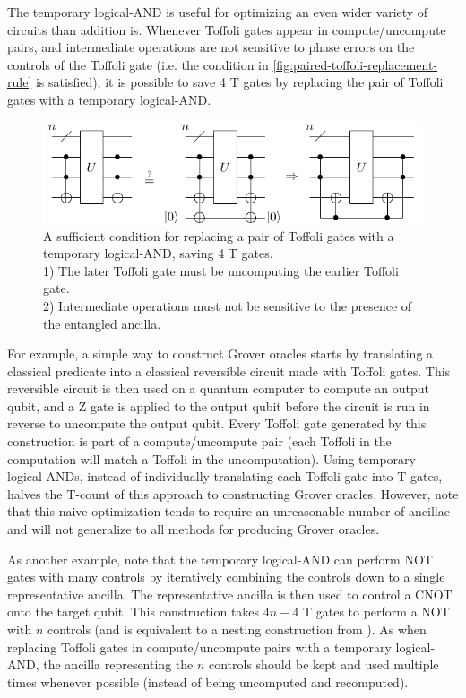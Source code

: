 \documentclass[twocolumn,accepted=2018-05-25]{quantumarticle}
\begin{document}
The temporary logical-AND is useful for optimizing an even wider variety of circuits than addition is.
Whenever Toffoli gates appear in compute/uncompute pairs, and intermediate operations are not sensitive to phase errors on the controls of the Toffoli gate (i.e. the condition in \autoref{fig:paired-toffoli-replacement-rule} is satisfied), it is possible to save 4 T gates by replacing the pair of Toffoli gates with a temporary logical-AND.

\begin{figure}
  \includegraphics[width=\linewidth]{paired-toffoli-replacement-rule.pdf}
  \caption{
	A sufficient condition for replacing a pair of Toffoli gates with a temporary logical-AND, saving 4 T gates.\\
	1) The later Toffoli gate must be uncomputing the earlier Toffoli gate.\\
	2) Intermediate operations must not be sensitive to the presence of the entangled ancilla.
  }
  \label{fig:paired-toffoli-replacement-rule}
\end{figure}

For example, a simple way to construct Grover oracles starts by translating a classical predicate into a classical reversible circuit made with Toffoli gates.
This reversible circuit is then used on a quantum computer to compute an output qubit, and a Z gate is applied to the output qubit before the circuit is run in reverse to uncompute the output qubit.
Every Toffoli gate generated by this construction is part of a compute/uncompute pair (each Toffoli in the computation will match a Toffoli in the uncomputation).
Using temporary logical-ANDs, instead of individually translating each Toffoli gate into T gates, halves the T-count of this approach to constructing Grover oracles.
However, note that this naive optimization tends to require an unreasonable number of ancillae and will not generalize to all methods for producing Grover oracles.

As another example, note that the temporary logical-AND can perform NOT gates with many controls by iteratively combining the controls down to a single representative ancilla.
The representative ancilla is then used to control a CNOT onto the target qubit.
This construction takes $4n-4$ T gates to perform a NOT with $n$ controls (and is equivalent to a nesting construction from \cite{Jones2013}).
As when replacing Toffoli gates in compute/uncompute pairs with a temporary logical-AND, the ancilla representing the $n$ controls should be kept and used multiple times whenever possible (instead of being uncomputed and recomputed).
\end{document}
